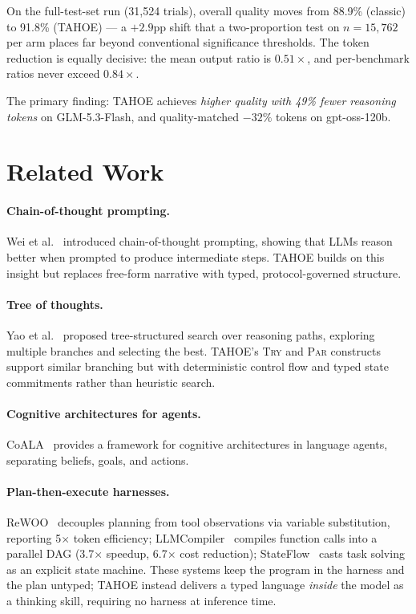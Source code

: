 \documentclass[11pt,a4paper]{article}
\begin{document}
On the full-test-set run (31{,}524 trials), overall quality moves from 88.9\% (classic) to 91.8\% (TAHOE) --- a $+2.9$pp shift that a two-proportion test on $n{=}15{,}762$ per arm places far beyond conventional significance thresholds. The token reduction is equally decisive: the mean output ratio is $0.51\times$, and per-benchmark ratios never exceed $0.84\times$.

The primary finding: TAHOE achieves \emph{higher quality with 49\% fewer reasoning tokens} on GLM-5.3-Flash, and quality-matched $-32\%$ tokens on gpt-oss-120b.

\section{Related Work}
\label{sec:related}

\paragraph{Chain-of-thought prompting.}
Wei et al.~\cite{wei2022cot} introduced chain-of-thought prompting, showing that LLMs reason better when prompted to produce intermediate steps.
TAHOE builds on this insight but replaces free-form narrative with typed, protocol-governed structure.

\paragraph{Tree of thoughts.}
Yao et al.~\cite{yao2023tot} proposed tree-structured search over reasoning paths, exploring multiple branches and selecting the best.
TAHOE's \textsc{Try} and \textsc{Par} constructs support similar branching but with deterministic control flow and typed state commitments rather than heuristic search.

\paragraph{Cognitive architectures for agents.}
CoALA~\cite{sumers2023coala} provides a framework for cognitive architectures in language agents, separating beliefs, goals, and actions.

\paragraph{Plan-then-execute harnesses.}
ReWOO~\cite{xu2023rewoo} decouples planning from tool observations via variable substitution, reporting 5$\times$ token efficiency; LLMCompiler~\cite{kim2023llmcompiler} compiles function calls into a parallel DAG (3.7$\times$ speedup, 6.7$\times$ cost reduction); StateFlow~\cite{wu2024stateflow} casts task solving as an explicit state machine. These systems keep the program in the harness and the plan untyped; TAHOE instead delivers a typed language \emph{inside} the model as a thinking skill, requiring no harness at inference time.
\end{document}
